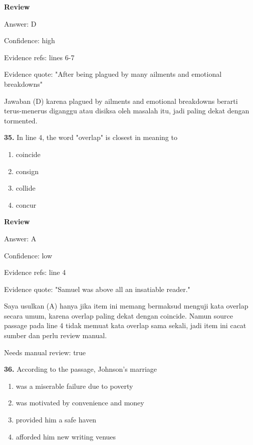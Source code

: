 \documentclass[12pt]{article}
\begin{document}
\par
\begingroup
\setlength{\parskip}{0pt}
\setlength{\parindent}{0pt}
\textbf{Review}\par
Answer: D\par
Confidence: high\par
Evidence refs: lines 6-7\par
Evidence quote: "After being plagued by many ailments and emotional breakdowns"\par
Jawaban (D) karena plagued by ailments and emotional breakdowns berarti terus-menerus diganggu atau disiksa oleh masalah itu, jadi paling dekat dengan tormented.\par
\endgroup
\par
\vspace{0.25\baselineskip}
\noindent\textbf{35.} In line 4, the word "overlap" is closest in meaning to
\begin{enumerate}[label=(\Alph*),leftmargin=*,itemsep=0.2em]
\item coincide
\item consign
\item collide
\item concur
\end{enumerate}
\par
\begingroup
\setlength{\parskip}{0pt}
\setlength{\parindent}{0pt}
\textbf{Review}\par
Answer: A\par
Confidence: low\par
Evidence refs: line 4\par
Evidence quote: "Samuel was above all an insatiable reader."\par
Saya usulkan (A) hanya jika item ini memang bermaksud menguji kata overlap secara umum, karena overlap paling dekat dengan coincide. Namun source passage pada line 4 tidak memuat kata overlap sama sekali, jadi item ini cacat sumber dan perlu review manual.\par
Needs manual review: true\par
\endgroup
\par
\vspace{0.25\baselineskip}
\noindent\textbf{36.} According to the passage, Johnson's marriage
\begin{enumerate}[label=(\Alph*),leftmargin=*,itemsep=0.2em]
\item was a miserable failure due to poverty
\item was motivated by convenience and money
\item provided him a safe haven
\item afforded him new writing venues
\end{enumerate}
\end{document}
